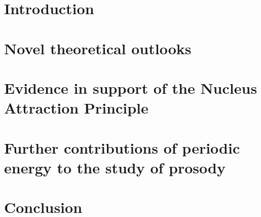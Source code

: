 \documentclass[output=book,
		  ]{langscibook}
\begin{document}
\maketitle
\frontmatter

{\sloppy\tableofcontents}




 \mainmatter


\part{Introduction}
 
 
 

\part{Novel theoretical outlooks}
 
 
 

\part{Evidence in support of the Nucleus Attraction Principle}
 
 

\part{Further contributions of periodic energy to the study of prosody}
 

\part{Conclusion}
 

\appendix{} %
 

% 

\end{document}
